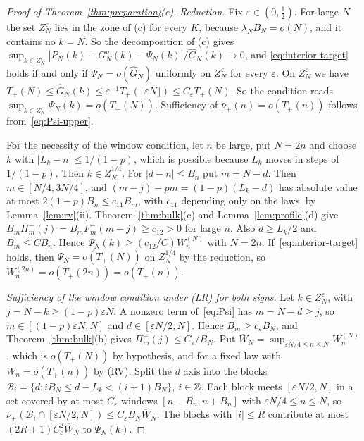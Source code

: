 \begin{proof}[Proof of Theorem~\ref{thm:preparation}(e)]
\emph{Reduction.} Fix $\varepsilon\in(0,\frac12)$. For large $N$ the set
$Z^\varepsilon_N$ lies in the zone of (c) for every $K$, because $\lambda_NB_N=o(N)$, and
it contains no $k=N$. So the decomposition of (c) gives
$\sup_{k\in Z^\varepsilon_N}|P_N(k)-G^\nu_N(k)-\Psi_N(k)|/\widehat G_N(k)\to0$, and
\eqref{eq:interior-target} holds if and only if $\Psi_N=o(\widehat G_N)$ uniformly on
$Z^\varepsilon_N$ for every $\varepsilon$. On $Z^\varepsilon_N$ we have
$T_\plus(N)\le\widehat G_N(k)\le\varepsilon^{-1}T_\plus(\lfloor\varepsilon N\rfloor)\le
C_\varepsilon T_\plus(N)$. So the condition reads
$\sup_{k\in Z^\varepsilon_N}\Psi_N(k)=o(T_\plus(N))$. Sufficiency of
$\bar\nu_\plus(n)=o(T_\plus(n))$ follows from~\eqref{eq:Psi-upper}.

For the necessity of the window condition, let $n$ be large, put $N=2n$ and choose
$k$ with $|L_k-n|\le1/(1-p)$, which is possible because $L_k$ moves in steps of
$1/(1-p)$. Then $k\in Z^{1/4}_N$. For $|d-n|\le B_n$ put $m=N-d$. Then
$m\in[N/4,3N/4]$, and $(m-j)-pm=(1-p)(L_k-d)$ has absolute value at most
$2(1-p)B_n\le c_{11}B_m$, with $c_{11}$ depending only on the laws, by
Lemma~\ref{lem:rv}(ii). Theorem~\ref{thm:bulk}(c) and Lemma~\ref{lem:profile}(d) give
$B_m\Pi^\minus_m(j)=B_mF^\minus_m(m-j)\ge c_{12}>0$ for large $n$. Also $d\ge L_k/2$ and
$B_m\le CB_n$. Hence $\Psi_N(k)\ge(c_{12}/C)W^{(N)}_n$ with $N=2n$. If~\eqref{eq:interior-target}
holds, then $\Psi_N=o(T_\plus(N))$ on $Z^{1/4}_N$ by the reduction, so
$W^{(2n)}_n=o(T_\plus(2n))=o(T_\plus(n))$.

\emph{Sufficiency of the window condition under (LR) for both signs.} Let
$k\in Z^\varepsilon_N$, with $j=N-k\ge(1-p)\varepsilon N$. A
nonzero term of~\eqref{eq:Psi} has $m=N-d\ge j$, so $m\in[(1-p)\varepsilon N,N]$ and
$d\in[\varepsilon N/2,N]$. Hence $B_m\ge c_\varepsilon B_N$, and
Theorem~\ref{thm:bulk}(b) gives $\Pi^\minus_m(j)\le C_\varepsilon/B_N$. Put
$\overline W_N=\sup_{\varepsilon N/4\le n\le N}W^{(N)}_n$, which is $o(T_\plus(N))$ by hypothesis,
and for a fixed law with $W_n=o(T_\plus(n))$ by (RV).
Split the $d$ axis into the blocks $\mathcal B_i=\{d:iB_N\le d-L_k<(i+1)B_N\}$,
$i\in\mathbb{Z}$. Each block meets $[\varepsilon N/2,N]$ in a set covered by at most
$C_\varepsilon$ windows $[n-B_n,n+B_n]$ with $\varepsilon N/4\le n\le N$, so
$\nu_\plus(\mathcal B_i\cap[\varepsilon N/2,N])\le C_\varepsilon B_N\overline W_N$. The
blocks with $|i|\le R$ contribute at most $(2R+1)C^2_\varepsilon\overline W_N$ to
$\Psi_N(k)$.


\end{proof}
